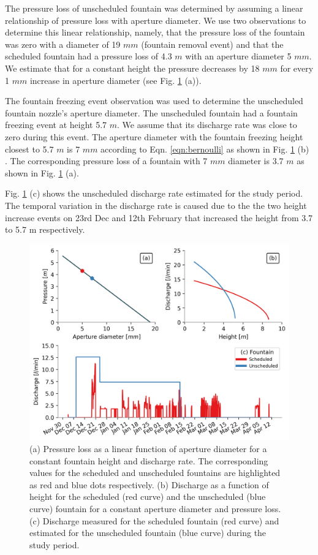 \documentclass[tc, manuscript]{copernicus}
\begin{document}
The pressure loss of unscheduled fountain was determined by assuming a linear relationship of pressure loss with
aperture diameter. We use two observations to determine this linear relationship, namely, that the pressure loss
of the fountain was zero with a diameter of 19 $mm$ (fountain removal event) and that the scheduled fountain had
a pressure loss of 4.3 $m$ with an aperture diameter 5 $mm$. We estimate that for a constant height the pressure
decreases by 18 $mm$ for every 1 $mm$ increase in aperture diameter (see Fig. \ref{fig:fountains} (a)).

The fountain freezing event observation was used to determine the unscheduled fountain nozzle's aperture
diameter. The unscheduled fountain had a fountain freezing event at height 5.7 $m$. We assume that its discharge
rate was close to zero during this event.  The aperture diameter with the fountain freezing height closest to
5.7 $m$ is 7 $mm$ according to Eqn. \ref{eqn:bernoulli} as shown in Fig. \ref{fig:fountains} (b) . The
corresponding pressure loss of a fountain with 7 $mm$ diameter is 3.7 $m$ as shown in Fig. \ref{fig:fountains}
(a).

Fig. \ref{fig:fountains} (c) shows the unscheduled discharge rate estimated for the study period. The temporal
variation in the discharge rate is caused due to the the two height increase events on 23rd Dec and 12th
February that increased the height from 3.7 to 5.7 m respectively.

\begin{figure}[t]
\includegraphics[width=12cm]{Figures/fountains.png}

\caption{ (a) Pressure loss as a linear function of aperture diameter for a constant fountain height and
  discharge rate. The corresponding values for the scheduled and unscheduled fountains are highlighted as red
  and blue dots respectively. (b) Discharge as a function of height for the scheduled (red curve) and the
  unscheduled (blue curve) fountain for a constant aperture diameter and pressure loss. (c) Discharge measured
  for the scheduled fountain (red curve) and estimated for the unscheduled fountain (blue curve) during the
study period.}

\label{fig:fountains}
\end{figure}
\end{document}
